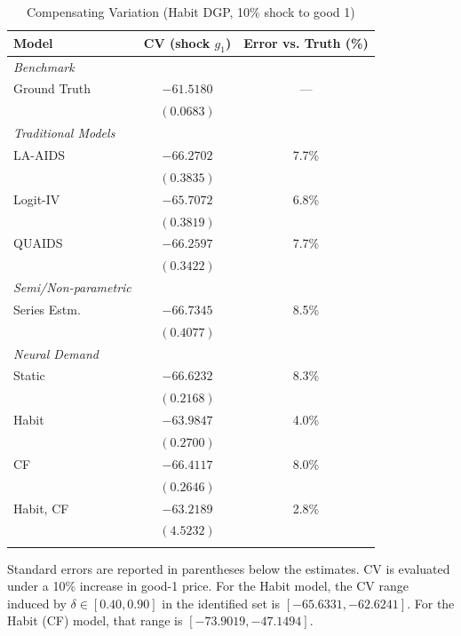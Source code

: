 \begin{table}[htbp]
  \centering
  \caption{Compensating Variation (Habit DGP, 10\% shock to good 1)}
  \label{tab:sim_welfare_habit_g1}
  \begin{tabular}{lcc}
    \toprule
    \textbf{Model} & \textbf{CV (shock $g_1$)} & \textbf{Error vs. Truth (\%)} \\
    \midrule
    \textit{Benchmark} & & \\
    Ground Truth & $-61.5180$ & --- \\
                 & $(0.0683)$ & \\
    \addlinespace
    \textit{Traditional Models} & & \\
    LA-AIDS      & $-66.2702$ & 7.7\% \\
                 & $(0.3835)$ & \\
    \addlinespace
    Logit-IV     & $-65.7072$ & 6.8\% \\
                 & $(0.3819)$ & \\
    \addlinespace
    QUAIDS       & $-66.2597$ & 7.7\% \\
                 & $(0.3422)$ & \\
    \addlinespace
    \textit{Semi/Non-parametric} & & \\
    Series Estm. & $-66.7345$ & 8.5\% \\
                 & $(0.4077)$ & \\
    \addlinespace
    \textit{Neural Demand} & & \\
    Static       & $-66.6232$ & 8.3\% \\
                 & $(0.2168)$ & \\
    \addlinespace
    Habit        & $-63.9847$ & 4.0\% \\
                 & $(0.2700)$ & \\
    \addlinespace
    CF           & $-66.4117$ & 8.0\% \\
                 & $(0.2646)$ & \\
    \addlinespace
    Habit, CF    & $-63.2189$ & 2.8\% \\
                 & $(4.5232)$ & \\
    \bottomrule
    \addlinespace
  \end{tabular}
  \begin{tablenotes} Standard errors are reported in parentheses below the estimates. CV is evaluated under a 10\% increase in good-1 price. For the Habit model, the CV range induced by $\delta \in [0.40, 0.90]$ in the identified set is $[-65.6331, -62.6241]$. For the Habit (CF) model, that range is $[-73.9019, -47.1494]$.
  \end{tablenotes}
\end{table}
